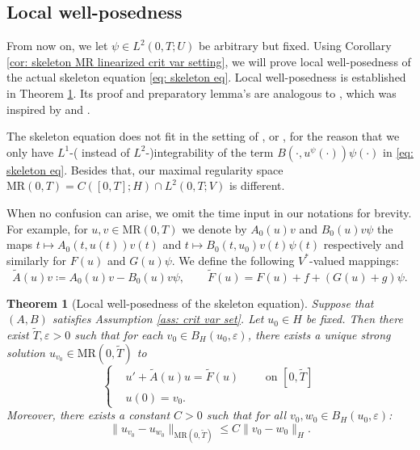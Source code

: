 \documentclass{amsart}
\renewcommand{\MR}{\mathrm{MR}}
\newcommand{\<}{\langle}
\newcommand{\?}{\rangle}
\theoremstyle{plain}
\newtheorem{theorem}{Theorem}[section]
\theoremstyle{remark}
\theoremstyle{plain}
\numberwithin{equation}{section}
\newcommand{\eps}{\varepsilon}
\begin{document}
\subsection{Local well-posedness}\label{sec: local skeleton}

From now on, we let $\psi\in L^2(0,T;U)$ be arbitrary but fixed.
Using Corollary \ref{cor: skeleton MR linearized crit var setting}, we will prove local well-posedness of the actual skeleton equation \eqref{eq: skeleton eq}. Local well-posedness is established in Theorem \ref{th: local well posedness skeleton}. Its proof and preparatory lemma's are analogous to \cite[\S 18.2]{HNVWvolume3}, which was inspired by \cite{pruss17addendum} and \cite{pruss18JDE}.

The skeleton equation does not fit in the setting of \cite{HNVWvolume3}, \cite{pruss17addendum} or \cite{pruss18JDE}, for the reason that we only have $L^1$-( instead of $L^2$-)integrability of the term $B(\cdot,u^\psi(\cdot))\psi(\cdot)$ in \eqref{eq: skeleton eq}. Besides that, our maximal regularity space $\MR(0,T)=C([0,T];H)\cap L^2(0,T;V)$ is different.

When no confusion can arise, we omit the time input in our notations for brevity. For example, for $u,v\in\MR(0,T)$ we denote by $A_0(u)v$ and $B_0(u)v\psi$ the maps $t\mapsto A_0(t,u(t))v(t)$ and $t\mapsto B_0(t,u_0)v(t)\psi(t)$ respectively and similarly for $F(u)$ and $G(u)\psi$. We define the following $V^*$-valued mappings:
\begin{equation*}
  \tilde{A}(u)v\coloneqq A_0(u)v-B_0(u)v\psi,\qquad \tilde{F}(u)=F(u)+f+(G(u)+g)\psi.
\end{equation*}

\begin{theorem}[Local well-posedness of the skeleton equation]\label{th: local well posedness skeleton}
Suppose that $(A,B)$ satisfies Assumption \ref{ass: crit var set}.
Let $u_0\in H$ be fixed. Then there exist $\tilde{T},\eps>0$ such that for each $v_0\in B_H(u_0,\eps)$,
there exists a unique strong solution $u_{v_0}\in \MR(0,\tilde{T})$ to
\begin{equation}\label{eq: local well-posed}
  \begin{cases}
    &u'+\tilde{A}(u)u=\tilde{F}(u)\qquad \text{ on } [0,\tilde{T}] \\
    &u(0)=v_0.
  \end{cases}
\end{equation}
Moreover, there exists a constant $C>0$ such that for all $v_0,w_0\in B_H(u_0,\eps)$:
\begin{equation}\label{eq: ct dependence local well-posed}
  \|u_{v_0}-u_{w_0}\|_{\MR(0,\tilde{T})}\leq C\|v_0-w_0\|_H.
\end{equation}
\end{theorem}
\end{document}
